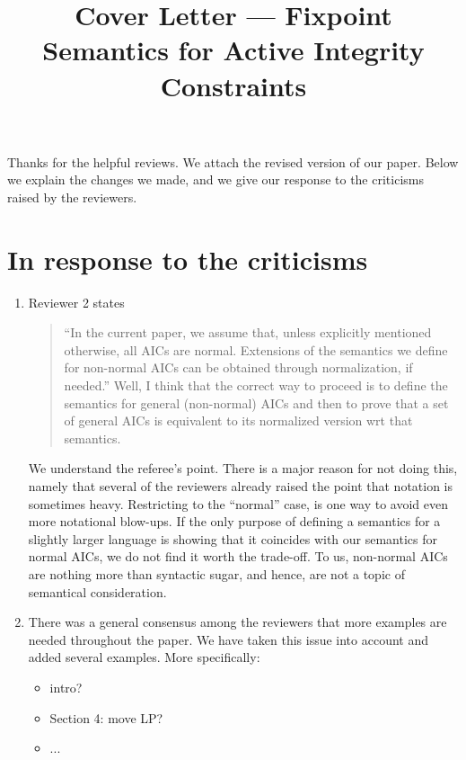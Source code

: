 \documentclass{article}
\title{Cover Letter --- Fixpoint Semantics for Active Integrity Constraints}
\begin{document}
\maketitle
Thanks for the helpful reviews. We attach the revised version of our paper. 
Below we explain the changes we made, and we give our response to the criticisms raised by the reviewers. 




\section{In response to the criticisms}
	\begin{enumerate}
	 \item Reviewer 2 states
	 \begin{quote}
	  ``In the current paper, we assume that, unless explicitly mentioned otherwise, all AICs are normal.
Extensions of the semantics we deﬁne for non-normal AICs can be obtained through normalization, if needed.''
Well, I think that the correct way to proceed is to define the semantics for general (non-normal) AICs and
then to prove that a set of general AICs is equivalent to its normalized version wrt that semantics.
	 \end{quote}
         We understand the referee's point. There is a major reason for not doing this, namely that several of the reviewers already raised the point that notation is sometimes heavy. Restricting to the ``normal'' case, is one way to avoid even more notational blow-ups. If the only purpose of defining a semantics for a slightly larger language is showing that it coincides with our semantics for normal AICs, we do not find it worth the trade-off. To us, non-normal AICs are nothing more than syntactic sugar, and hence, are not a topic of semantical consideration. 


	 \item There was a general consensus among the reviewers that more examples are needed throughout the paper. We have taken this issue into account and added several examples. More specifically:
	  \begin{itemize}
	  \item intro?
	  \item Section 4: move LP? 
	  \item ... 
	  \end{itemize}
	  

\end{enumerate}
\end{document}
